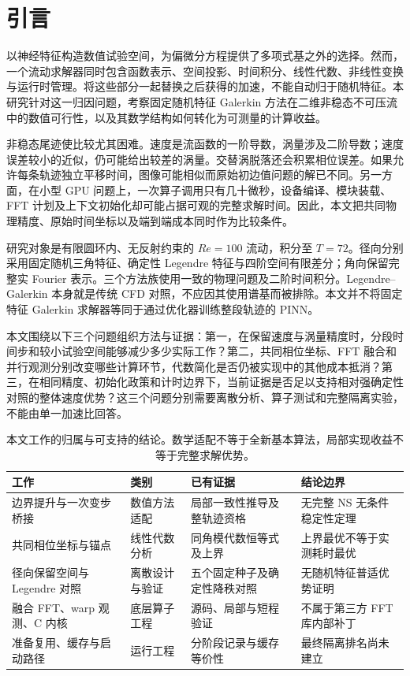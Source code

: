 \section{引言}
\label{sec:introduction}

以神经特征构造数值试验空间，为偏微分方程提供了多项式基之外的选择。然而，一个流动求解器同时包含函数表示、空间投影、时间积分、线性代数、非线性变换与运行时管理。将这些部分一起替换之后获得的加速，不能自动归于随机特征。本研究针对这一归因问题，考察固定随机特征 Galerkin 方法在二维非稳态不可压流中的数值可行性，以及其数学结构如何转化为可测量的计算收益。

非稳态尾迹使比较尤其困难。速度是流函数的一阶导数，涡量涉及二阶导数；速度误差较小的近似，仍可能给出较差的涡量。交替涡脱落还会积累相位误差。如果允许每条轨迹独立平移时间，图像可能相似而原始初边值问题的解已不同。另一方面，在小型 GPU 问题上，一次算子调用只有几十微秒，设备编译、模块装载、FFT 计划及上下文初始化却可能占据可观的完整求解时间。因此，本文把共同物理精度、原始时间坐标以及端到端成本同时作为比较条件。

研究对象是有限圆环内、无反射约束的 \(Re=100\) 流动，积分至 \(T=72\)。径向分别采用固定随机三角特征、确定性 Legendre 特征与四阶空间有限差分；角向保留完整实 Fourier 表示。三个方法族使用一致的物理问题及二阶时间积分。Legendre--Galerkin 本身就是传统 CFD 对照，不应因其使用谱基而被排除。本文并不将固定特征 Galerkin 求解器等同于通过优化器训练整段轨迹的 PINN。

本文围绕以下三个问题组织方法与证据：第一，在保留速度与涡量精度时，分段时间步和较小试验空间能够减少多少实际工作？第二，共同相位坐标、FFT 融合和并行观测分别改变哪些计算环节，代数简化是否仍被实现中的其他成本抵消？第三，在相同精度、初始化政策和计时边界下，当前证据是否足以支持相对强确定性对照的整体速度优势？这三个问题分别需要离散分析、算子测试和完整隔离实验，不能由单一加速比回答。

\begin{table}[!htbp]
\centering\small
\caption{本文工作的归属与可支持的结论。数学适配不等于全新基本算法，局部实现收益不等于完整求解优势。}
\label{tab:contribution-map}
\begin{tabularx}{\linewidth}{@{}>{\raggedright\arraybackslash}p{.20\linewidth}XXX@{}}
\toprule
工作 & 类别 & 已有证据 & 结论边界 \\
\midrule
边界提升与一次变步桥接 & 数值方法适配 & 局部一致性推导及整轨迹资格 & 无完整 NS 无条件稳定性定理 \\
共同相位坐标与锚点 & 线性代数分析 & 同角模代数恒等式及上界 & 上界最优不等于实测耗时最优 \\
径向保留空间与 Legendre 对照 & 离散设计与验证 & 五个固定种子及确定性降秩对照 & 无随机特征普适优势证明 \\
融合 FFT、warp 观测、C 内核 & 底层算子工程 & 源码、局部与短程验证 & 不属于第三方 FFT 库内部补丁 \\
准备复用、缓存与启动路径 & 运行工程 & 分阶段记录与缓存等价性 & 最终隔离排名尚未建立 \\
\bottomrule
\end{tabularx}
\end{table}

